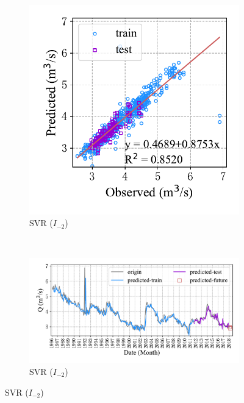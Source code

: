 \begin{figure}[!htbp]
\begin{subfigure}[b]{0.615\textwidth}
  \end{subfigure}
  \\
  \begin{subfigure}[b]{0.305\textwidth}
    \includegraphics[width=\textwidth]{Img/chap4_spr/spr_scatter_in_2_out_2_svr.pdf}
    \vspace{-1.2cm}
    \caption{SVR ($I_{-2}$)}
    \label{fig:spr_scatter_in_2_out_2_svr}
  \end{subfigure}
  ~
  \begin{subfigure}[b]{0.615\textwidth}
    \includegraphics[width=\textwidth]{Img/chap4_spr/spr_series_in_2_out_2_svr.pdf}
    \vspace{-1.2cm}
    \caption{SVR ($I_{-2}$)}
    \label{fig:spr_series_in_2_out_2_svr}

\end{subfigure}
\end{figure}
